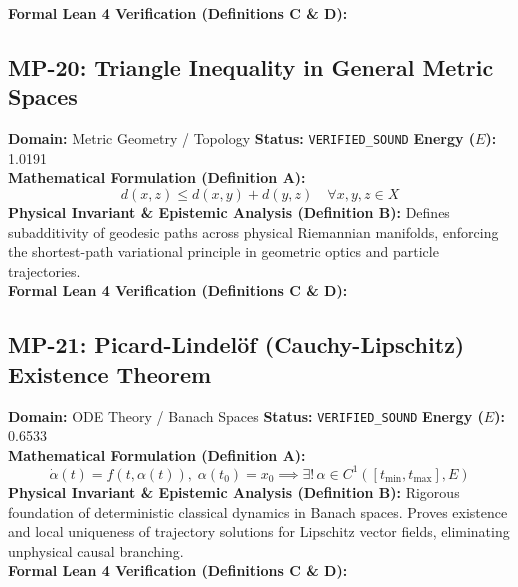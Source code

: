 \textbf{Formal Lean 4 Verification (Definitions C \& D):}


\vspace{1em}
\subsection{MP-20: Triangle Inequality in General Metric Spaces}
\textbf{Domain:} Metric Geometry / Topology \hfill \textbf{Status:} \texttt{VERIFIED\_SOUND} \hfill \textbf{Energy ($E$):} 1.0191\\
\textbf{Mathematical Formulation (Definition A):}
\begin{equation*}
d(x, z) \le d(x, y) + d(y, z) \quad \forall x, y, z \in X
\end{equation*}
\textbf{Physical Invariant \& Epistemic Analysis (Definition B):}
Defines subadditivity of geodesic paths across physical Riemannian manifolds, enforcing the shortest-path variational principle in geometric optics and particle trajectories.\\

\textbf{Formal Lean 4 Verification (Definitions C \& D):}


\vspace{1em}
\subsection{MP-21: Picard-Lindelöf (Cauchy-Lipschitz) Existence Theorem}
\textbf{Domain:} ODE Theory / Banach Spaces \hfill \textbf{Status:} \texttt{VERIFIED\_SOUND} \hfill \textbf{Energy ($E$):} 0.6533\\
\textbf{Mathematical Formulation (Definition A):}
\begin{equation*}
\dot{\alpha}(t) = f(t, \alpha(t)), \; \alpha(t_0) = x_0 \implies \exists!\, \alpha \in C^1([t_{\min}, t_{\max}], E)
\end{equation*}
\textbf{Physical Invariant \& Epistemic Analysis (Definition B):}
Rigorous foundation of deterministic classical dynamics in Banach spaces. Proves existence and local uniqueness of trajectory solutions for Lipschitz vector fields, eliminating unphysical causal branching.\\

\textbf{Formal Lean 4 Verification (Definitions C \& D):}


